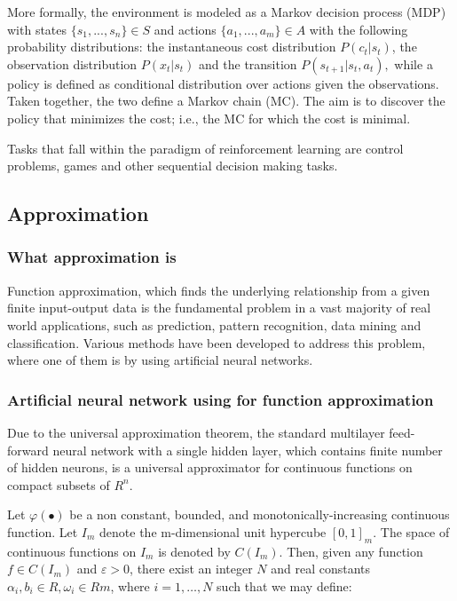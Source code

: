 \documentclass[a4paper,12pt]{article}
\begin{document}
More formally, the environment is modeled as a Markov decision process (MDP) with states $ \{s_1,...,s_n\}\in S $ and actions $\{a_1,...,a_m\} \in A $ with the following probability distributions: the instantaneous cost distribution $ P(c_t|s_t) $, the observation distribution $ P(x_t|s_t) $ and the transition $ P(s_{t+1}|s_t, a_t), $ while a policy is defined as conditional distribution over actions given the observations. Taken together, the two define a Markov chain (MC). The aim is to discover the policy that minimizes the cost; i.e., the MC for which the cost is minimal.

Tasks that fall within the paradigm of reinforcement learning are control problems, games and other sequential decision making tasks.

\subsection{Approximation}
\subsubsection{What approximation is}

Function approximation, which finds the underlying relationship from a given finite input-output data is the fundamental problem in a vast majority of real world applications, such as prediction, pattern recognition, data mining and classification. Various methods have been developed to address this problem, where one of them is by using artificial neural networks.

\subsubsection{Artificial neural network using for function approximation}

Due to the universal approximation theorem, the standard multilayer feed-forward neural network with a single hidden layer, which contains finite number of hidden neurons, is a universal approximator for continuous functions on compact subsets of $R^n$.

Let $\varphi(\bullet) $ be a non constant, bounded, and monotonically-increasing continuous function. Let $I_m$ denote the m-dimensional unit hypercube $ [0,1]_m. $ The space of continuous functions on $ I_m $ is denoted by $C(I_m)$. Then, given any function $ f \in C(I_m) $ and $ \varepsilon > 0 $, there exist an integer $ N $ and real constants $ \alpha_i, b_i \in R, \omega_i \in Rm $, where $ i = 1, \hdots, N $ such that we may define:
\end{document}
